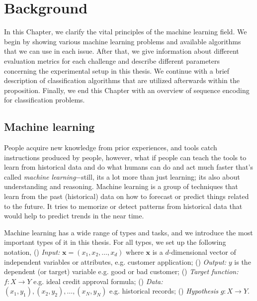 
\chapter{Background} \label{ch2} %
In this Chapter, we clarify the vital principles of the machine learning field. We begin by showing various machine learning problems and available algorithms that we can use in each issue. After that, we give information about different evaluation metrics for each challenge and describe different parameters concerning the experimental setup in this thesis. We continue with a brief description of classification algorithms that are utilized afterwards within the proposition. Finally, we end this Chapter with an overview of sequence encoding for classification problems. 

\ifpdf
    \graphicspath{{X/figures/PNG/}{X/figures/PDF/}{X/figures/}}
\else
    \graphicspath{{X/figures/EPS/}{X/figures/}}
\fi



\section{Machine learning}
People acquire new knowledge from prior experiences, and tools catch instructions produced by people, however, what if people can teach the tools to learn from historical data and do what humans can do and act much faster that's called \textit{machine learning}$-$still, its a lot more than just learning; its also about understanding and reasoning. Machine learning is a group of techniques that learn from the past (historical) data on how to forecast or predict things related to the future. It tries to memorize or detect patterns from historical data that would help to predict trends in the near time.

Machine learning has a wide range of types and tasks, and we introduce the most important types of it in this thesis. For all types, we set up the following notation, () \textit{Input:} $\textbf{x} = (x_1, x_2, \dots, x_d)$ where $\textbf{x}$ is a $d$-dimensional vector of independent variables or attributes, e.g. customer application; () \textit{Output:} $y$ is the dependent (or target) variable e.g. good or bad customer; () \textit{Target function:} $f: X \to Y$ e.g. ideal credit approval formula; () \textit{Data:} $(x_1, y_1), (x_2, y_2), \dots, (x_N, y_N)$ e.g. historical records; () \textit{Hypothesis} $g: X \to Y$.

